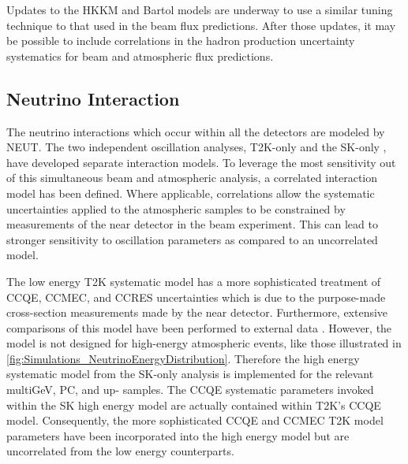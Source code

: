 Updates to the HKKM and Bartol models are underway \cite{Sato2022-ss} to use a similar tuning technique to that used in the beam flux predictions. After those updates, it may be possible to include correlations in the hadron production uncertainty systematics for beam and atmospheric flux predictions.

\subsection{Neutrino Interaction}
\label{sec:SelsAndSysts_Systs_Interaction}

The neutrino interactions which occur within all the detectors are modeled by NEUT. The two independent oscillation analyses, T2K-only \cite{t2k_tn_344} and the SK-only \cite{Kamiokande_Collaboration2017-nf}, have developed separate interaction models. To leverage the most sensitivity out of this simultaneous beam and atmospheric analysis, a correlated interaction model has been defined. Where applicable, correlations allow the systematic uncertainties applied to the atmospheric samples to be constrained by measurements of the near detector in the beam experiment. This can lead to stronger sensitivity to oscillation parameters as compared to an uncorrelated model.

The low energy T2K systematic model has a more sophisticated treatment of CCQE, CCMEC, and CCRES uncertainties which is due to the purpose-made cross-section measurements made by the near detector. Furthermore, extensive comparisons of this model have been performed to external data \cite{t2k_tn_344}. However, the model is not designed for high-energy atmospheric events, like those illustrated in \autoref{fig:Simulations_NeutrinoEnergyDistribution}. Therefore the high energy systematic model from the SK-only analysis is implemented for the relevant multiGeV, PC, and up-\quickmath{\mu} samples. The CCQE systematic parameters invoked within the SK high energy model are actually contained within T2K's CCQE model. Consequently, the more sophisticated CCQE and CCMEC T2K model parameters have been incorporated into the high energy model but are uncorrelated from the low energy counterparts. 

